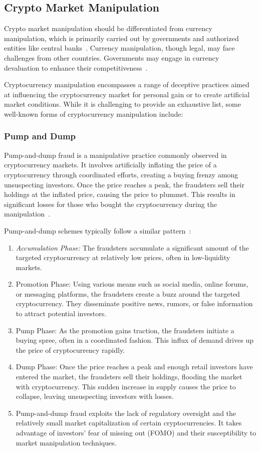 \subsection{Crypto Market Manipulation}
Crypto market manipulation should be differentiated from currency manipulation, which is primarily carried out by governments
and authorized entities like central banks~\cite{goldstein2018currency}. Currency manipulation, though legal, may face challenges
from other countries. Governments may engage in currency devaluation to enhance their competitiveness~\cite{goldstein2018currency}.

Cryptocurrency manipulation encompasses a range of deceptive practices aimed at influencing the cryptocurrency market for
personal gain or to create artificial market conditions. While it is challenging to provide an exhaustive list, some
well-known forms of cryptocurrency manipulation include:

\subsubsection{Pump and Dump}
Pump-and-dump fraud is a manipulative practice commonly observed in cryptocurrency markets. It involves artificially inflating
the price of a cryptocurrency through coordinated efforts, creating a buying frenzy among unsuspecting investors. Once the
price reaches a peak, the fraudsters sell their holdings at the inflated price, causing the price to plummet. This results
in significant losses for those who bought the cryptocurrency during the manipulation~\cite{karim2018manipulation}.

Pump-and-dump schemes typically follow a similar pattern~\cite{cheah2015pump}:

\begin{enumerate}
    \item \textit{Accumulation Phase:} The fraudsters accumulate a significant amount of the targeted cryptocurrency at
    relatively low prices, often in low-liquidity markets.
    \item Promotion Phase: Using various means such as social media, online forums, or messaging platforms, the fraudsters
    create a buzz around the targeted cryptocurrency. They disseminate positive news, rumors, or false information to attract
    potential investors.
    \item Pump Phase: As the promotion gains traction, the fraudsters initiate a buying spree, often in a coordinated fashion.
    This influx of demand drives up the price of cryptocurrency rapidly.
    \item Dump Phase: Once the price reaches a peak and enough retail investors have entered the market, the fraudsters
    sell their holdings, flooding the market with cryptocurrency. This sudden increase in supply causes the price to collapse,
    leaving unsuspecting investors with losses.
    \item Pump-and-dump fraud exploits the lack of regulatory oversight and the relatively small market capitalization of
    certain cryptocurrencies. It takes advantage of investors' fear of missing out (FOMO) and their susceptibility to market
    manipulation techniques.
\end{enumerate}

